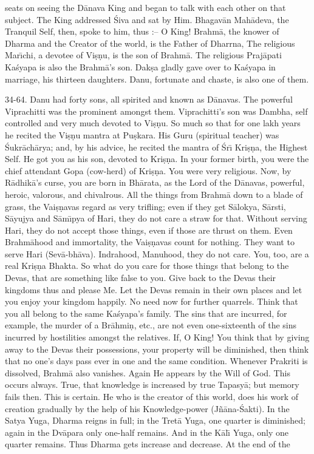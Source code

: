 seats on seeing the D\=anava King and began to talk with each other on that subject. The King addressed \'Siva and sat by Him. Bhagav\=an Mah\=adeva, the Tranquil Self, then, spoke to him, thus :-- O King! Brahm\=a, the knower of Dharma and the Creator of the world, is the Father of Dharrna, The religious Mar\={\i}chi, a devotee of Vi\d{s}\d{n}u, is the son of Brahm\=a. The religious Praj\=apati Ka\'syapa is also the Brahm\=a's son. Dak\d{s}a gladly gave over to Ka\'syapa in marriage, his thirteen daughters. Danu, fortunate and chaste, is also one of them.

34-64. Danu had forty sons, all spirited and known as D\=anavas. The powerful Viprachitti was the prominent amongst them. Viprachitti's son was Dambha, self controlled and very much devoted to Vi\d{s}\d{n}u. So much so that for one lakh years he recited the Vi\d{s}\d{n}u mantra at Pu\d{s}kara. His Guru (spiritual teacher) was \'Sukr\=ach\=arya; and, by his advice, he recited the mantra of \'Sr\={\i} Kri\d{s}\d{n}a, the Highest Self. He got you as his son, devoted to Kri\d{s}\d{n}a. In your former birth, you were the chief attendant Gopa (cow-herd) of Kri\d{s}\d{n}a. You were very religious. Now, by R\=adhik\=a's curse, you are born in Bh\=arata, as the Lord of the D\=anavas, powerful, heroic, valorous, and chivalrous. All the things from Brahm\=a down to a blade of grass, the Vai\d{s}\d{n}avas regard as very trifling; even if they get S\=alokya, S\=arsti, S\=ayujya and S\=am\={\i}pya of Hari, they do not care a straw for that. Without serving Hari, they do not accept those things, even if those are thrust on them. Even Brahm\=ahood and immortality, the Vai\d{s}\d{n}avas count for nothing. They want to serve Hari (Sev\=a-bh\=ava). Indrahood, Manuhood, they do not care. You, too, are a real Kri\d{s}\d{n}a Bhakta. So what do you care for those things that belong to the Devas, that are something like false to you. Give back to the Devas their kingdoms thus and please Me. Let the Devas remain in their own places and let you enjoy your kingdom happily. No need now for further quarrels. Think that you all belong to the same Ka\'syapa's family. The sins that are incurred, for example, the murder of a Br\=ahmi\d{n}, etc., are not even one-sixteenth of the sins incurred by hostilities amongst the relatives. If, O King! You think that by giving away to the Devas their possessions, your property will be diminished, then think that no one's days pass ever in one and the same condition. Whenever Prakriti is dissolved, Brahm\=a also vanishes. Again He appears by the Will of God. This occurs always. True, that knowledge is increased by true Tapasy\=a; but memory fails then. This is certain. He who is the creator of this world, does his work of creation gradually by the help of his Knowledge-power (J\~n\=ana-\'Sakti). In the Satya Yuga, Dharma reigns in full; in the Tret\=a Yuga, one quarter is diminished; again in the Dv\=apara only one-half remains. And in the K\=al\={\i} Yuga, only one quarter remains. Thus Dharma gets increase and decrease. At the end of the

